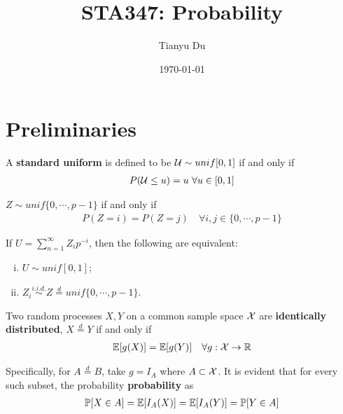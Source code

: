 \documentclass{article}
\title{STA347: Probability}
\date{\today}
\author{Tianyu Du}
\begin{document}
    \maketitle
    \tableofcontents
    \newpage
   	\section{Preliminaries}
   	\begin{definition}
   		A \textbf{standard uniform} is defined to be $\mathcal{{U}} \sim unif[0, 1]$ if and only if 
   		\begin{align}
   			P(\mathcal{{U}} \leq u) = u\ \forall u \in [0, 1]	
   		\end{align}
   	\end{definition}
   	
   	\begin{definition}
   		$Z \sim unif\{0, \cdots, p-1\}$ if and only if
   		\begin{align}
   			P(Z=i) = P(Z=j)\quad \forall i, j \in \{0, \cdots, p-1\}
   		\end{align}
   	\end{definition}
   	
   	\begin{theorem}
   		If $U = \sum_{n=1}^\infty Z_i p^{-i}$, then the following are equivalent:
   		\begin{enumerate}[(i)]
   			\item $U \sim unif[0, 1]$;
   			\item $Z_i \overset{i.i.d.}{\sim} Z \overset{d}{=} unif\{0, \cdots, p-1\}$.
   		\end{enumerate}
   	\end{theorem}
   	
   	\begin{definition}
   		Two random processes $X, Y$ on a common sample space $\mathcal{{X}}$ are \textbf{identically distributed}, $X \overset{d}{=} Y$ if and only if
   		\begin{align}
   			\mathbb{E}[{g(X)}] = \mathbb{E}[{g(Y)}]\quad \forall g: \mathcal{{X}} \to \mathbb{R}
   		\end{align}
   	\end{definition}
   	\begin{proposition}
   		Specifically, for $A \overset{d}{=} B$, take $g = I_A$ where $A \subset \mathcal{{X}}$. It is evident that for every such subset, the probability \textbf{probability} as 
	   	\begin{align}
	   		\mathbb{P}[{X \in A}] = \mathbb{E}[{I_A(X)}] = \mathbb{E}[{I_A(Y)}] = \mathbb{P}[{Y \in A}]
	   	\end{align}
   	\end{proposition}
   	
\end{document}
